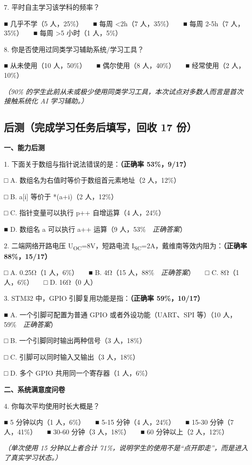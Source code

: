 \documentclass[zihao=-4,a4paper,UTF8,fontset=windows]{ctexart}
\begin{document}
7. 平时自主学习该学科的频率？

■ 几乎不学（5 人，25\%）　　■ 每周 <2h（7 人，35\%）　　■ 每周 2-5h（7 人，35\%）　　■ 每周 >5 小时（1 人，5\%）

8. 你是否使用过同类学习辅助系统/学习工具？

■ 从未使用（10 人，50\%）　　■ 偶尔使用（8 人，40\%）　　■ 经常使用（2 人，10\%）

\textit{（90\% 的学生此前从未或极少使用同类学习工具，本次试点对多数人而言是首次接触系统化 AI 学习辅助。）}

\subsection{后测（完成学习任务后填写，回收 17 份）}

\textbf{一、能力后测}

1. 下面关于数组与指针说法错误的是：\textbf{（正确率 53\%，9/17）}

□ A. 数组名为右值时等价于数组首元素地址（2 人，12\%）

□ B. a[i] 等价于 *(a+i)（2 人，12\%）

□ C. 指针变量可以执行 p++ 自增运算（4 人，24\%）

■ D. 数组名 a 可以执行 a++ 运算（9 人，53\%　\textit{正确答案}）

2. 二端网络开路电压 U\textsubscript{OC}=8V，短路电流 I\textsubscript{SC}=2A，戴维南等效内阻为：\textbf{（正确率 88\%，15/17）}

□ A. 0.25Ω（1 人，6\%）　　■ B. 4Ω（15 人，88\%　\textit{正确答案}）　　□ C. 8Ω（1 人，6\%）　　□ D. 16Ω（0 人）

3. STM32 中，GPIO 引脚复用功能是指：\textbf{（正确率 59\%，10/17）}

■ A. 一个引脚可配置为普通 GPIO 或者外设功能（UART、SPI 等）（10 人，59\%　\textit{正确答案}）

□ B. 一个引脚同时输出两种信号（3 人，18\%）

□ C. 引脚可以同时输入又输出（3 人，18\%）

□ D. 多个 GPIO 共用同一个寄存器（1 人，6\%）

\textbf{二、系统满意度问卷}

4. 你每次平均使用时长大概是？

■ 5 分钟以内（1 人，6\%）　　■ 5-15 分钟（4 人，24\%）　　■ 15-30 分钟（7 人，41\%）　　■ 30-60 分钟（3 人，18\%）　　■ 60 分钟以上（2 人，12\%）

\textit{（单次使用 15 分钟以上者合计 71\%，说明学生的使用不是“点开即走”，而是进入了真实学习状态。）}
\end{document}
